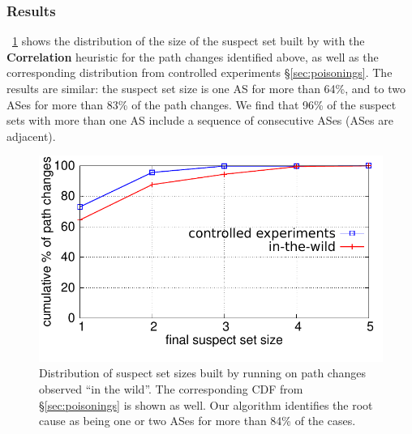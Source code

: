 \subsubsection{Results}

\fig~\ref{fig:real-world-rc} shows the distribution of the size of the
suspect set built by \ouralgo with the \textbf{Correlation} 
heuristic for the
path changes identified above, as well as the 
corresponding distribution from controlled experiments \S\ref{sec:poisonings}. The
results are similar: the suspect set size is one AS for more than 64\%, and to two ASes 
for more than 83\% of the path changes. We find that 96\% of the suspect sets with more than
one AS include a sequence of consecutive ASes (\ie ASes are adjacent).

\begin{figure}[t]
\centering
\includegraphics[width=\columnwidth]{figs/real-world.pdf}
\vspace{-2em}
%
\caption{Distribution of suspect set sizes built by \ouralgo running on
	path changes observed ``in the wild''. The
corresponding CDF from \S\ref{sec:poisonings} is shown
as well. Our algorithm identifies the root cause as being one or two ASes for
more than 84\% of the cases.}
%
\label{fig:real-world-rc}
\vspace{1em}
\end{figure}
